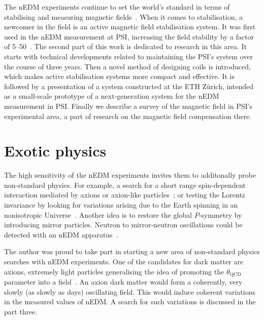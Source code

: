 The nEDM experiments continue to set the world's standard in terms of stabilising and measuring magnetic fields~\cite{GREEN1998381,1748-0221-10-12-P12003,Groeger2005,Baker2014}. When it comes to stabilisation, a newcomer in the field is an active magnetic field stabilisation system. It was first used in the nEDM measurement at PSI, increasing the field stability by a factor of 5--50~\cite{Afach2014}. The second part of this work is dedicated to research in this area. It starts with technical developments related to maintaining the PSI's system over the course of three years. Then a novel method of designing coils is introduced, which makes active stabilisation systems more compact and effective. It is followed by a presentation of a system constructed at the ETH Zürich, intended as a small-scale prototype of a next-generation system for the nEDM measurement in PSI. Finally we describe a survey of the magnetic field in PSI's experimental area, a part of research on the magnetic field compensation there.


\section{Exotic physics}

The high sensitivity of the nEDM experiments invites them to additonally probe non-standard physics. For example, a search for a short range spin-dependent interaction mediated by axions or axion-like particles~\cite{Afach2015Exotic}; or testing the Lorentz invariance by looking for variations arising due to the Earth spinning in an nonisotropic Universe~\cite{Altarev2009,ALTAREV20112365}. Another idea is to restore the global $P$-symmetry by introducing mirror particles. Neutron to mirror-neutron oscillations could be detected with an nEDM apparatus~\cite{PhysRevD.80.032003}.

The author was proud to take part in starting a new area of non-standard physics searches with nEDM experiments. One of the candidates for dark matter are axions, extremely light particles generalising the idea of promoting the $\theta_\text{QCD}$ parameter into a field~\cite{PhysRevLett.38.1440}. An axion dark matter would form a coherently, very slowly (as slowly as days) oscillating field. This would induce coherent variations in the measured values of nEDM. A search for such variations is discussed in the part three.